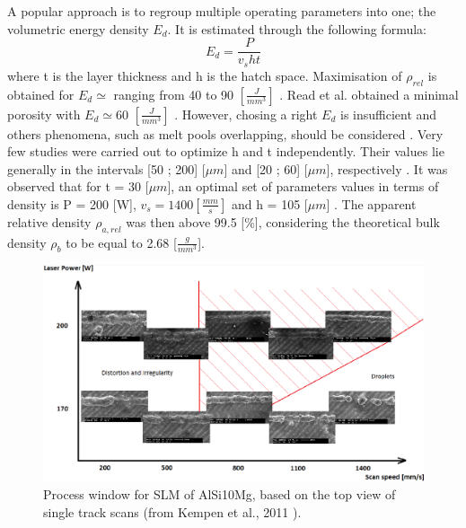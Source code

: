 A popular approach is to regroup multiple operating parameters into one; the volumetric energy density $E_d$. It is estimated through the following formula: 
$$E_d=\frac{P}{v_s h t} $$
where t is the layer thickness and h is the hatch space.  Maximisation of $\rho_{rel}$ is obtained for $E_d\simeq $ ranging from 40 to 90 $[\frac{J}{mm^3}]$ \parencite{Trevisan2017}. Read et al. obtained a minimal porosity with $E_d \simeq 60$ $[\frac{J}{mm^3}]$ \parencite{Read150417}. However, chosing a right $E_d$ is insufficient and others phenomena, such as melt pools overlapping, should be considered \parencite{Tang170309}. Very few studies were carried out to optimize h and t independently. Their values lie generally in the intervals [50 ; 200] [$\mu m$] and [20 ; 60] [$\mu m$], respectively \parencite{aboulkhair2016,Brandl121509,Kempen110817,Mertens170406}. It was observed that for t = 30 [$\mu m$], an optimal set of parameters values in terms of density is P = 200 [W], $v_s=1400 [\frac{mm}{s}]$ and h = 105 [$\mu m$] \parencite{Kempen110817}. The apparent relative density $\rho_{a,rel}$ was then above 99.5 [\%], considering the theoretical bulk density $\rho_b$ to be equal to 2.68 [$\frac{g}{mm^3}$].\\

\begin{figure}[ht]
\centering
\includegraphics[scale=0.34]{Images/Pvs}
\decoRule
\caption[Process window for SLM of AlSi10Mg, based on the top view of single track scans]{Process window for SLM of AlSi10Mg, based on the top view of single track scans (from Kempen et al., 2011 \parencite{Kempen110817}).}
\label{fig:Pvs}
\end{figure}

